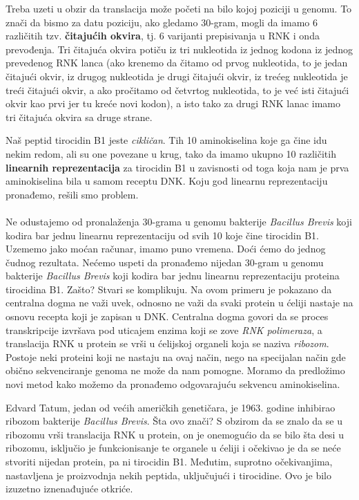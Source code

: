  Treba uzeti u obzir da translacija može početi na bilo kojoj poziciji u genomu. To znači da bismo za datu poziciju, ako gledamo $30$-gram, mogli da imamo 6 različitih tzv. \textbf{čitajućih okvira}, tj. 6 varijanti prepisivanja u RNK i onda prevođenja. Tri čitajuća okvira potiču iz tri nukleotida iz jednog kodona iz jednog prevedenog RNK lanca (ako krenemo da čitamo od prvog nukleotida, to je jedan čitajući okvir, iz drugog nukleotida je drugi čitajući okvir, iz trećeg nukleotida je treći čitajući okvir, a ako pročitamo od četvrtog nukleotida, to je već isti čitajući okvir kao prvi jer tu kreće novi kodon), a isto tako za drugi RNK lanac imamo tri čitajuća okvira sa druge strane. 

Naš peptid tirocidin B1 jeste \textit{cikličan}. Tih 10 aminokiselina koje ga čine idu nekim redom, ali su one povezane u krug, tako da imamo ukupno 10 različitih \textbf{linearnih reprezentacija} za tirocidin B1 u zavisnosti od toga koja nam je prva aminokiselina bila u samom receptu DNK. Koju god linearnu reprezentaciju pronađemo, rešili smo problem. 
\\\\
\indent Ne odustajemo od pronalaženja $30$-grama u genomu bakterije \textit{Bacillus Brevis} koji kodira bar jednu linearnu reprezentaciju od svih 10 koje čine tirocidin B1. Uzememo jako moćan računar, imamo puno vremena. Doći ćemo do jednog čudnog rezultata. Nećemo uspeti da pronađemo nijedan $30$-gram u genomu bakterije \textit{Bacillus Brevis} koji kodira bar jednu linearnu reprezentaciju proteina tirocidina B1. Zašto? Stvari se komplikuju. Na ovom primeru je pokazano da centralna dogma ne važi uvek, odnosno ne važi da svaki protein u ćeliji nastaje na osnovu recepta koji je zapisan u DNK. Centralna dogma govori da se proces transkripcije izvršava pod uticajem enzima koji se zove \textit{RNK polimeraza}, a translacija RNK u protein se vrši u ćelijskoj organeli koja se naziva \textit{ribozom}. Postoje neki proteini koji ne nastaju na ovaj način, nego na specijalan način gde obično sekvenciranje genoma ne može da nam pomogne. Moramo da predložimo novi metod kako možemo da pronađemo odgovarajuću sekvencu aminokiselina. 

Edvard Tatum, jedan od većih američkih genetičara, je 1963. godine inhibirao ribozom bakterije \textit{Bacillus Brevis}. Šta ovo znači? S obzirom da se znalo da se u ribozomu vrši translacija RNK u protein, on je onemogućio da se bilo šta desi u ribozomu, isključio je funkcionisanje te organele u ćeliji i očekivao je da se neće stvoriti nijedan protein, pa ni tirocidin B1. Međutim, suprotno očekivanjima, nastavljena je proizvodnja nekih peptida, uključujući i tirocidine. Ovo je bilo izuzetno iznenađujuće otkriće.

